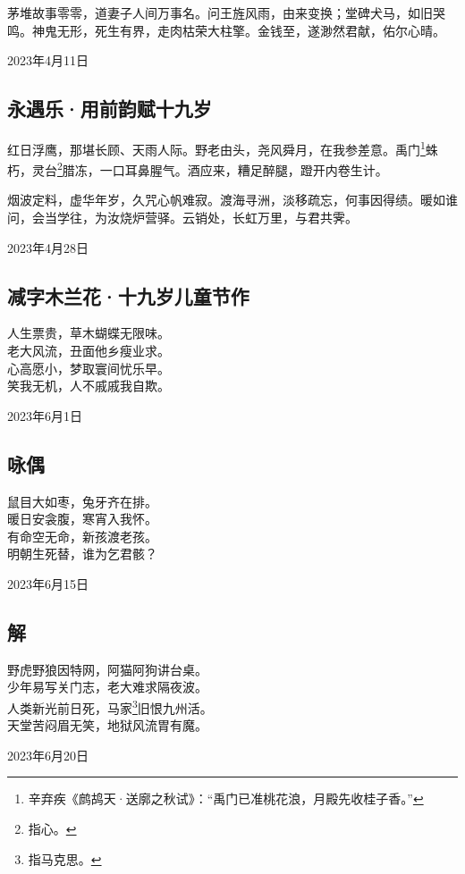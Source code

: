 \documentclass[a5paper]{ctexart}
\begin{document}
	茅堆故事零零，道妻子人间万事名。问王旌风雨，由来变换；堂碑犬马，如旧哭鸣。神鬼无形，死生有界，走肉枯荣大柱擎。金钱至，遂渺然君献，佑尔心晴。
	\begin{flushright}
		2023年4月11日
	\end{flushright}
	
	\subsection{永遇乐·用前韵赋十九岁}
	红日浮鹰，那堪长顾、天雨人际。野老由头，尧风舜月，在我参差意。禹门\footnote{辛弃疾《鹧鸪天·送廓之秋试》：“禹门已准桃花浪，月殿先收桂子香。”}蛛朽，灵台\footnote{指心。}腊冻，一口耳鼻腥气。酒应来，糟足醉腿，蹬开内卷生计。
	
	烟波定料，虚华年岁，久咒心帆难寂。渡海寻洲，淡移疏忘，何事因得绩。暖如谁问，会当学往，为汝烧炉营驿。云销处，长虹万里，与君共霁。
	\begin{flushright}
		2023年4月28日
	\end{flushright}
	
	\subsection{减字木兰花·十九岁儿童节作}
	\begin{center}
		人生票贵，草木蝴蝶无限味。\\
		老大风流，丑面他乡瘦业求。\\
		心高愿小，梦取寰间忧乐早。\\
		笑我无机，人不戚戚我自欺。
		
	\end{center}
	\hfill 2023年6月1日
	
	\subsection{咏偶}
	\begin{center}
		鼠目大如枣，兔牙齐在排。\\
		暖日安衾腹，寒宵入我怀。\\
		有命空无命，新孩渡老孩。\\
		明朝生死替，谁为乞君骸？
		
	\end{center}
	\hfill 2023年6月15日
	
	\subsection{解}
	\begin{center}
		野虎野狼因特网，阿猫阿狗讲台桌。\\
		少年易写关门志，老大难求隔夜波。\\
		人类新光前日死，马家\footnote{指马克思。}旧恨九州活。\\
		天堂苦闷眉无笑，地狱风流胃有魔。
		
	\end{center}
	\hfill 2023年6月20日
	
\end{document}
